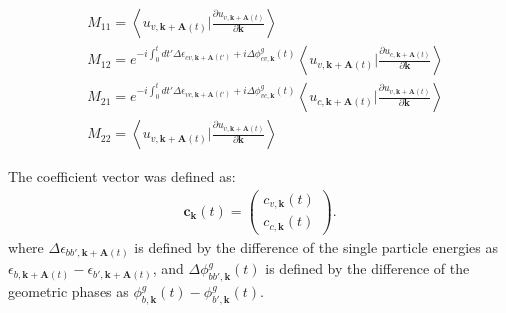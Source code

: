 \begin{align}
	 & M_{11} = \left \langle u_{v,\mathbf k+\mathbf A(t)}\Big |\frac{\partial u_{v,\mathbf k+\mathbf
	A(t)}}{\partial \mathbf k} \right \rangle                                                                                                   \\
	 & M_{12} = e^{-i\int^t_0dt' \Delta \epsilon_{cv,\mathbf k+ \mathbf A(t')}+i \Delta \phi^g_{cv,\mathbf k}(t)}
	\left \langle u_{v,\mathbf k+\mathbf A(t)}\Big |\frac{\partial u_{c,\mathbf k+\mathbf A(t)}}{\partial
	\mathbf k} \right \rangle                                                                                                                   \\
	 & M_{21} = e^{-i\int^t_0dt' \Delta \epsilon_{vc,\mathbf k+ \mathbf A(t')}+i \Delta \phi^g_{vc,\mathbf k}(t)}
	\left \langle u_{c,\mathbf k+\mathbf A(t)}\Big |\frac{\partial u_{v,\mathbf k+\mathbf A(t)}}{\partial \mathbf k} \right \rangle             \\
	 & M_{22} = \left \langle u_{v,\mathbf k+\mathbf A(t)}\Big |\frac{\partial u_{v,\mathbf k+\mathbf A(t)}}{\partial \mathbf k} \right \rangle
\end{align}

The coefficient vector was defined as:
\begin{align}
	\mathbf c_{\mathbf k}(t) = \left(
	\begin{array}{cc}
			c_{v,\mathbf k}(t) \\
			c_{c,\mathbf k}(t)
		\end{array}
	\right).
\end{align}
where $\Delta\epsilon_{bb',\mathbf k+ \mathbf A(t)}$ is defined by the difference of the single particle energies as $\epsilon_{b,\mathbf k+ \mathbf A(t)}-\epsilon_{b',\mathbf k+ \mathbf A(t)}$, and $\Delta \phi^g_{bb',\mathbf k}(t)$ is defined by the difference of the geometric phases as $\phi^g_{b,\mathbf k}(t)-\phi^g_{b',\mathbf k}(t)$.

